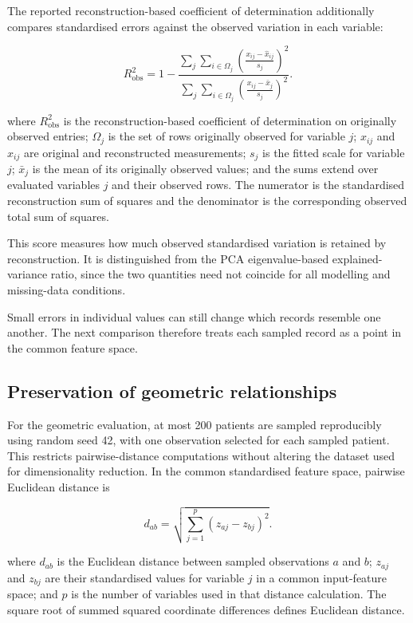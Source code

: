 \noindent The reported reconstruction-based coefficient of determination
additionally compares standardised errors against the observed variation
in each variable:

\[
R^2_{\mathrm{obs}}=
1-
\frac{\sum_j\sum_{i\in\Omega_j}
	\left(\frac{x_{ij}-\hat{x}_{ij}}{s_j}\right)^2}
{\sum_j\sum_{i\in\Omega_j}
	\left(\frac{x_{ij}-\bar{x}_j}{s_j}\right)^2}.\tag{3.8.4}
\]

\noindent where \(R^2_{\mathrm{obs}}\) is the reconstruction-based coefficient of
determination on originally observed entries; \(\Omega_j\) is the set of
rows originally observed for variable \(j\); \(x_{ij}\) and
\(\hat{x}_{ij}\) are original and reconstructed measurements; \(s_j\) is
the fitted scale for variable \(j\); \(\bar{x}_j\) is the mean of its
originally observed values; and the sums extend over evaluated variables
\(j\) and their observed rows. The numerator is the standardised
reconstruction sum of squares and the denominator is the corresponding
observed total sum of squares.

\noindent This score measures how much observed standardised variation is retained
by reconstruction. It is distinguished from the PCA eigenvalue-based
explained-variance ratio, since the two quantities need not coincide for
all modelling and missing-data conditions.

\noindent Small errors in individual values can still change which records resemble one another. The next comparison therefore treats each sampled record as a point in the common feature space.

\subsection{Preservation of geometric relationships}\label{preservation-of-geometric-relationships}

For the geometric evaluation, at most 200 patients are sampled
reproducibly using random seed 42, with one observation selected for
each sampled patient. This restricts pairwise-distance computations
without altering the dataset used for dimensionality reduction. In the
common standardised feature space, pairwise Euclidean distance is

\[
d_{ab}=\sqrt{\sum_{j=1}^{p}(z_{aj}-z_{bj})^2}.\tag{3.8.5}
\]

\noindent where \(d_{ab}\) is the Euclidean distance between sampled observations
\(a\) and \(b\); \(z_{aj}\) and \(z_{bj}\) are their standardised values
for variable \(j\) in a common input-feature space; and \(p\) is the
number of variables used in that distance calculation. The square root
of summed squared coordinate differences defines Euclidean distance.


